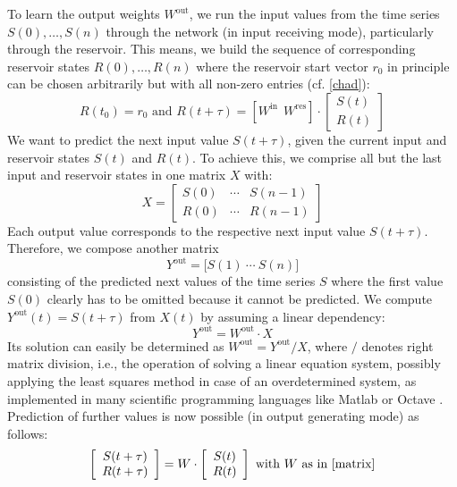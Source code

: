 \documentclass[twoside,11pt]{article}
\theoremstyle{definition}
\begin{document}
To learn the output weights $W^\mathrm{out}$, we run the input values from the
time series $S(0),\dots,S(n)$ through the network (in input receiving mode),
particularly through the reservoir. This means, we build the sequence of
corresponding reservoir states $R(0),\dots,R(n)$ where the reservoir start
vector $r_0$ in principle can be chosen arbitrarily but with all non-zero
entries (cf. \cref{chad}):
\begin{equation}\label{Res}
	R(t_0) = r_0 \textrm{~and~} R(t+\tau) =
	\left[ W^\mathrm{in} ~~ W^\mathrm{res} \right] \cdot
	\left[ \begin{array}{c} S(t) \\ R(t) \end{array} \right]
\end{equation}
We want to predict the next input value $S(t+\tau)$, given the current input and
reservoir states $S(t)$ and $R(t)$. To achieve this, we comprise
all but the last input and reservoir states in one matrix $X$ with:
\begin{equation}\label{Xin}
    X = \left[ \begin{array}{ccc}
	S(0) & \cdots & S(n-1)\\
	R(0) & \cdots & R(n-1)
	\end{array} \right]
\end{equation}
Each output value corresponds to the respective next input value $S(t+\tau)$.
Therefore, we compose another matrix
\begin{equation}\label{Yout}
	Y^\mathrm{out} = \big[ S(1)\ \cdots\ S(n) \big]
\end{equation}
consisting of the predicted next values of the time series $S$
where the first value $S(0)$ clearly has to be omitted because it cannot be
predicted. We compute $Y^\mathrm{out}(t) = S(t+\tau)$ from $X(t)$ by assuming a
linear dependency:
\begin{equation}\label{linear}
	Y^\mathrm{out} = W^\mathrm{out} \cdot X
\end{equation}
Its solution can easily be determined as $W^\mathrm{out} = Y^\mathrm{out}/X$,
where $/$ denotes right matrix division, i.e., the operation of solving a linear
equation system, possibly applying the least squares method in case of an
overdetermined system, as implemented in many scientific programming languages
like Matlab \citep{HH17} or Octave \citep{EB+17}. Prediction of further values
is now possible (in output generating mode) as follows:
\begin{equation}\label{predict}
	\left[ \begin{array}{c} S(t+\tau) \\ R(t+\tau) \end{array} \right]
	= W \cdot \left[ \begin{array}{c} S(t) \\ R(t) \end{array} \right]
	\textrm{~with~} W \textrm{~as in \cref{matrix}}
\end{equation}
\end{document}
